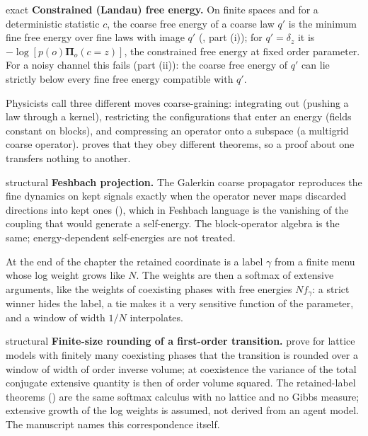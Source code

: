 \begin{analogy}{exact}
\textbf{Constrained (Landau) free energy.} On finite spaces and for a deterministic statistic $c$, the
coarse free energy of a coarse law $q'$ is the minimum fine free energy over fine laws with image $q'$
(, part (i)); for $q'=\delta_z$ it is
$-\log[p(o)\boldsymbol\Pi_o(c=z)]$, the constrained free energy at fixed order parameter. For a noisy
channel this fails (part (ii)): the coarse free energy of $q'$ can lie strictly below every fine free
energy compatible with $q'$.
\end{analogy}

Physicists call three different moves coarse-graining: integrating out (pushing a law through a
kernel), restricting the configurations that enter an energy (fields constant on blocks), and
compressing an operator onto a subspace (a multigrid coarse operator). 
proves that they obey different theorems, so a proof about one transfers nothing to another.

\begin{analogy}{structural}
\textbf{Feshbach projection.} The Galerkin coarse propagator reproduces the fine dynamics on kept
signals exactly when the operator never maps discarded directions into kept ones
(), which in Feshbach language is the vanishing of the coupling
that would generate a self-energy. The block-operator algebra is the same; energy-dependent
self-energies are not treated.
\end{analogy}

At the end of the chapter the retained coordinate is a label $\gamma$ from a finite menu whose log weight
grows like $N$. The weights are then a softmax of extensive arguments, like the weights of coexisting
phases with free energies $Nf_\gamma$: a strict winner hides the label, a tie makes it a very sensitive
function of the parameter, and a window of width $1/N$ interpolates.

\begin{analogy}{structural}
\textbf{Finite-size rounding of a first-order transition.} \citet{BorgsKotecky1990} prove for lattice
models with finitely many coexisting phases that the transition is rounded over a window of width of
order inverse volume; at coexistence the variance of the total conjugate extensive quantity is then of
order volume squared. The retained-label theorems () are the same
softmax calculus with no lattice and no Gibbs measure; extensive growth of the log weights is assumed,
not derived from an agent model. The manuscript names this correspondence itself.
\end{analogy}

